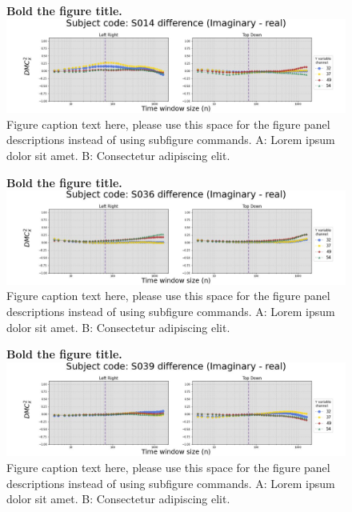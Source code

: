 \documentclass[10pt,letterpaper]{article}
\begin{document}

\begin{figure}[!h]
  \caption{{\bf Bold the figure title.}
  \includegraphics[width=.9\textwidth]{../output/figs/ir_diff/S014.jpg}
  Figure caption text here, please use this space for the figure panel descriptions instead of using subfigure commands. A: Lorem ipsum dolor sit amet. B: Consectetur adipiscing elit.}
  \label{fig:ir_diff_s014}
\end{figure}


\begin{figure}[!h]
  \caption{{\bf Bold the figure title.}
  \includegraphics[width=.9\textwidth]{../output/figs/ir_diff/S036.jpg}
  Figure caption text here, please use this space for the figure panel descriptions instead of using subfigure commands. A: Lorem ipsum dolor sit amet. B: Consectetur adipiscing elit.}
  \label{fig:ir_diff_s036}
\end{figure}

\begin{figure}[!h]
  \caption{{\bf Bold the figure title.}
  \includegraphics[width=.9\textwidth]{../output/figs/ir_diff/S039.jpg}
  Figure caption text here, please use this space for the figure panel descriptions instead of using subfigure commands. A: Lorem ipsum dolor sit amet. B: Consectetur adipiscing elit.}
  \label{fig:ir_diff_s039}
\end{figure}
\end{document}
